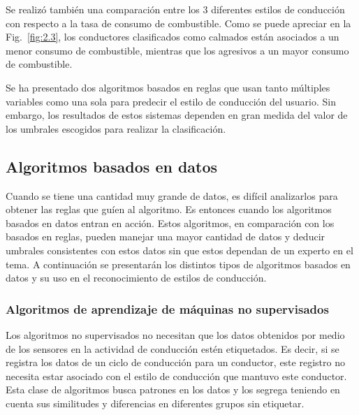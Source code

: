 Se realizó también una comparación entre los 3 diferentes estilos de conducción con respecto a la tasa de consumo de combustible. Como se puede apreciar en la Fig.~\ref{fig:2.3}, los conductores clasificados como calmados están asociados a un menor consumo de combustible, mientras que los agresivos a un mayor consumo de combustible.


Se ha presentado dos algoritmos basados en reglas que usan tanto múltiples variables \cite{6957822} como una sola \cite{4938719} para predecir el estilo de conducción del usuario. Sin embargo, los resultados de estos sistemas dependen en gran medida del valor de los umbrales escogidos para realizar la clasificación.

\subsection{Algoritmos basados en datos}
Cuando se tiene una cantidad muy grande de datos, es difícil analizarlos para obtener las reglas que guíen al algoritmo. Es entonces cuando los algoritmos basados en datos entran en acción. Estos algoritmos, en comparación con los basados en reglas, pueden manejar una mayor cantidad de datos y deducir umbrales consistentes con estos datos sin que estos dependan de un experto en el tema. A continuación se presentarán los distintos tipos de algoritmos basados en datos y su uso en el reconocimiento de estilos de conducción.

\renewcommand{\thesubsubsection}{\Alph{subsubsection}}

\subsubsection{Algoritmos de aprendizaje de máquinas no supervisados}
Los algoritmos no supervisados no necesitan que los datos obtenidos por medio de los sensores en la actividad de conducción estén etiquetados. Es decir, si se registra los datos de un ciclo de conducción para un conductor, este registro no necesita estar asociado con el estilo de conducción que mantuvo este conductor. Esta clase de algoritmos busca patrones en los datos y los segrega teniendo en cuenta sus similitudes y diferencias en diferentes grupos sin etiquetar.

